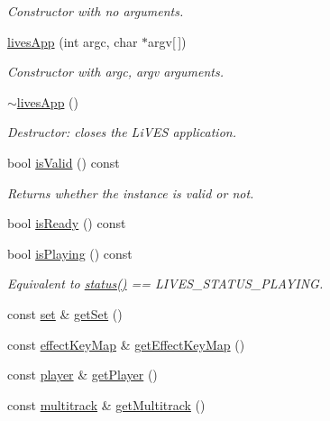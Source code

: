 \begin{DoxyCompactItemize}
\begin{DoxyCompactList}\small\item\em Constructor with no arguments. \end{DoxyCompactList}\item 
\hyperlink{classlives_1_1livesApp_ac3d16720326557505c96ff115621464c}{lives\-App} (int argc, char $\ast$argv\mbox{[}$\,$\mbox{]})
\begin{DoxyCompactList}\small\item\em Constructor with argc, argv arguments. \end{DoxyCompactList}\item 
\hyperlink{classlives_1_1livesApp_a34e80bddd5b7832c98d499adecc29410}{$\sim$lives\-App} ()
\begin{DoxyCompactList}\small\item\em Destructor\-: closes the Li\-V\-E\-S application. \end{DoxyCompactList}\item 
bool \hyperlink{classlives_1_1livesApp_a909c5e836672f9e1caee66912830ab60}{is\-Valid} () const 
\begin{DoxyCompactList}\small\item\em Returns whether the instance is valid or not. \end{DoxyCompactList}\item 
bool \hyperlink{classlives_1_1livesApp_a4fcefcf7c5dc1e745a12c5a0c07fe220}{is\-Ready} () const 
\item 
bool \hyperlink{classlives_1_1livesApp_acc0efc13838f8a1e7af93851d27e8b90}{is\-Playing} () const 
\begin{DoxyCompactList}\small\item\em Equivalent to \hyperlink{classlives_1_1livesApp_afcb05464af9146f5efbb896f2611c8e7}{status()} == L\-I\-V\-E\-S\-\_\-\-S\-T\-A\-T\-U\-S\-\_\-\-P\-L\-A\-Y\-I\-N\-G. \end{DoxyCompactList}\item 
const \hyperlink{classlives_1_1set}{set} \& \hyperlink{classlives_1_1livesApp_a7cd417df6c5522dfd889c91be3ed2b60}{get\-Set} ()
\item 
const \hyperlink{classlives_1_1effectKeyMap}{effect\-Key\-Map} \& \hyperlink{classlives_1_1livesApp_a37cca224eeac4874e643027ab90404a3}{get\-Effect\-Key\-Map} ()
\item 
const \hyperlink{classlives_1_1player}{player} \& \hyperlink{classlives_1_1livesApp_af5b3614c4342e724fbda72b115469634}{get\-Player} ()
\item 
const \hyperlink{classlives_1_1multitrack}{multitrack} \& \hyperlink{classlives_1_1livesApp_ac64c03e2fe67aabdb9838ef0486f7f10}{get\-Multitrack} ()

\end{DoxyCompactItemize}
